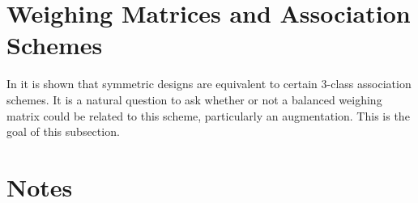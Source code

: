\documentclass[../../main]{subfiles}
\begin{document}
 \section{\centering Weighing Matrices and Association Schemes}
 
 In \cite{distance-regular-graphs} it is shown that symmetric designs are
 equivalent to certain 3-class association schemes. It is a natural question to
 ask whether or not a balanced weighing matrix could be related to this scheme,
 particularly an augmentation. This is the goal of this subsection. 
 
 \dinkus
 
 
 
 \singlespace
 
 \fancyhf{}

 \fancyhead[RO,LE]{\thepage}

 \section*{\centering Notes}
 \theenotes
 
 \doublespacing
 
 \biblio
\end{document}

